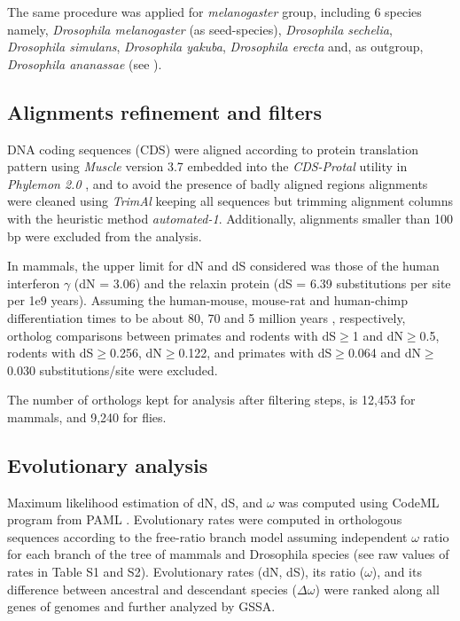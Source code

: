 The same procedure was applied for \textit{melanogaster} group, including 6 species namely, \textit{Drosophila melanogaster} (as \gls{seed}-species), \textit{Drosophila sechelia}, \textit{Drosophila simulans}, \textit{Drosophila yakuba}, \textit{Drosophila erecta} and, as outgroup, \textit{Drosophila ananassae} (see ).

\subsection{Alignments refinement and filters}
DNA coding sequences (CDS) were aligned according to protein translation pattern using \textit{Muscle} version 3.7 \cite{Edgar2004} embedded into the \textit{CDS-Protal} utility in \textit{Phylemon 2.0} \cite{Sanchez2011}, and to avoid the presence of badly aligned regions alignments were cleaned using \textit{TrimAl} \cite{Capella-Gutierrez2009} keeping all sequences but trimming alignment columns with the heuristic method \textit{automated-1}. Additionally, alignments smaller than 100 bp were excluded from the analysis. 

In mammals, the upper limit for dN and dS considered was those of the human interferon $\gamma$ (dN = 3.06) and the relaxin protein \cite{Graur2000} (dS = 6.39 substitutions per site per 1e9 years). Assuming the human-mouse, mouse-rat and human-chimp differentiation times to be about 80, 70 and 5 million years \cite{BlairHedges2003}, respectively, ortholog comparisons between primates and rodents with dS$\ge$1 and dN$\ge$0.5, rodents with dS$\ge$0.256, dN$\ge$0.122, and primates with dS$\ge$0.064 and dN$\ge$0.030 substitutions/site were excluded.

The number of orthologs kept for analysis after filtering steps, is 12,453 for mammals, and 9,240 for flies.

\subsection{Evolutionary analysis}

Maximum likelihood estimation of dN, dS, and $\omega$ was computed using CodeML program from PAML \cite{Yang2007}. Evolutionary rates were computed in orthologous sequences according to the free-ratio branch model assuming independent $\omega$ ratio for each branch of the tree of mammals and Drosophila species (see raw values of rates in Table S1 and S2). Evolutionary rates (dN, dS), its ratio ($\omega$), and its difference between ancestral and descendant species ($\Delta\omega$) were ranked along all genes of genomes and further analyzed by GSSA.

